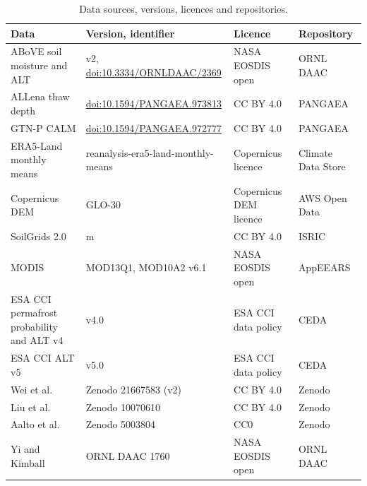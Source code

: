 \documentclass[pdflatex,sn-nature]{sn-jnl}
\begin{document}
\begin{table}[htbp]
\caption{Data sources, versions, licences and repositories.}\label{tab:s1}
\scriptsize
\begin{tabular}{@{}>{\raggedright\arraybackslash}p{}>{\raggedright\arraybackslash}p{}>{\raggedright\arraybackslash}p{}>{\raggedright\arraybackslash}p{}@{}}
\toprule
Data & Version, identifier & Licence & Repository \\
\midrule
ABoVE soil moisture and ALT\cite{Moore2025} & v2, \url{doi:10.3334/ORNLDAAC/2369} & NASA EOSDIS open & ORNL DAAC \\
ALLena thaw depth\cite{Veremeeva2025} & \url{doi:10.1594/PANGAEA.973813} & CC BY 4.0 & PANGAEA \\
GTN-P CALM\cite{Streletskiy2025} & \url{doi:10.1594/PANGAEA.972777} & CC BY 4.0 & PANGAEA \\
ERA5-Land monthly means\cite{munozsabater2021_era5_land} & reanalysis-era5-land-monthly-means & Copernicus licence & Climate Data Store \\
Copernicus DEM\cite{CopDEM2021} & GLO-30 & Copernicus DEM licence & AWS Open Data \\
SoilGrids 2.0\cite{Poggio2021} & 250 m & CC BY 4.0 & ISRIC \\
MODIS\cite{Didan2021,HallRiggs2021} & MOD13Q1, MOD10A2 v6.1 & NASA EOSDIS open & AppEEARS \\
ESA CCI permafrost probability and ALT v4\cite{Westermann2024} & v4.0 & ESA CCI data policy & CEDA \\
ESA CCI ALT v5\cite{Westermann2025} & v5.0 & ESA CCI data policy & CEDA \\
Wei et al.\cite{Wei2026} & Zenodo 21667583 (v2) & CC BY 4.0 & Zenodo \\
Liu et al.\cite{Liu2024} & Zenodo 10070610 & CC BY 4.0 & Zenodo \\
Aalto et al.\cite{Aalto2018} & Zenodo 5003804 & CC0 & Zenodo \\
Yi and Kimball\cite{YiKimball2019} & ORNL DAAC 1760 & NASA EOSDIS open & ORNL DAAC \\
\bottomrule
\end{tabular}
\end{table}
\end{document}
